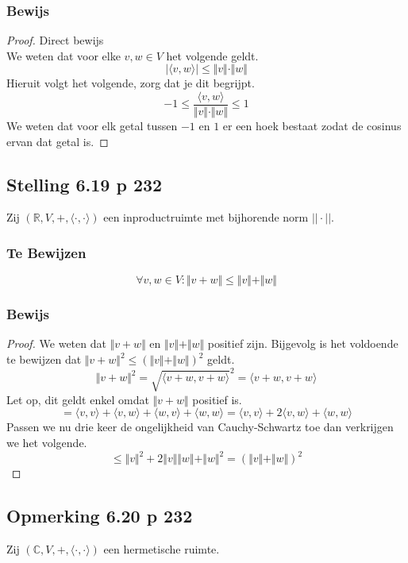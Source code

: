 \documentclass[lineaire_algebra_oplossingen.tex]{subfiles}
\begin{document}
\subsubsection*{Bewijs}
\begin{proof}
Direct bewijs\\
We weten dat voor elke $v,w\in V$ het volgende geldt.
\[
\vert\langle v,w\rangle\vert \le \Vert v\Vert\cdot \Vert w\Vert
\]
Hieruit volgt het volgende, zorg dat je dit begrijpt.
\[
-1 \le \frac{\langle v,w\rangle}{\Vert v\Vert\cdot \Vert w\Vert} \le 1
\]
We weten dat voor elk getal tussen $-1$ en $1$ er een hoek bestaat zodat de cosinus ervan dat getal is.
\end{proof}


\subsection{Stelling 6.19 p 232}
\label{6.19}
Zij $(\mathbb{R},V,+,\langle\cdot,\cdot\rangle)$ een inproductruimte met bijhorende norm $||\cdot ||$.

\subsubsection*{Te Bewijzen}
\[
\forall v,w \in V: \Vert v+w \Vert \le \Vert v\Vert + \Vert w\Vert
\]

\subsubsection*{Bewijs}
\begin{proof}
We weten dat $\Vert v+w \Vert$ en $\Vert v\Vert + \Vert w\Vert$ positief zijn. Bijgevolg is het voldoende te bewijzen dat $\Vert v+w \Vert^2 \le (\Vert v\Vert + \Vert w\Vert)^2$ geldt.
\[
 \Vert v+w \Vert^2 = \sqrt{\langle v+w,v+w\rangle}^2 = \langle v+w,v+w\rangle
\]
Let op, dit geldt enkel omdat $\Vert v+w \Vert$ positief is.
\[
= \langle v,v\rangle + \langle v,w\rangle + \langle w,v \rangle + \langle w,w \rangle =  \langle v,v\rangle + 2\langle v,w\rangle + \langle w,w \rangle
\]
Passen we nu drie keer de ongelijkheid van Cauchy-Schwartz toe dan verkrijgen we het volgende.
\[
\le \Vert v\Vert^2 + 2\Vert v\Vert \Vert w\Vert + \Vert w\Vert^2 = (\Vert v\Vert + \Vert w\Vert)^2
\]
\end{proof}


\subsection{Opmerking 6.20 p 232}
\label{6.20}
Zij $(\mathbb{C},V,+,\langle\cdot,\cdot\rangle)$ een hermetische ruimte.
\end{document}

